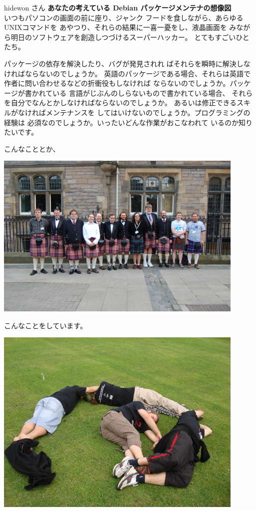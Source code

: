 \documentclass[cjk,dvipdfmx,12pt]{beamer}
\begin{document}
\begin{frame}{hidewon さん}
\textbf{あなたの考えている Debian パッケージメンテナの想像図}\\
いつもパソコンの画面の前に座り、ジャンク
フードを食しながら、あらゆるUNIXコマンドを
あやつり、それらの結果に一喜一憂をし、液晶画面を
みながら明日のソフトウェアを創造しつづけるスーパーハッカー。
とてもすごいひとたち。

パッケージの依存を解決したり、バグが発見されれ
ばそれらを瞬時に解決しなければならないのでしょうか。
英語のパッケージである場合、それらは英語で
作者に問い合わせるなどの折衝役もしなければ
ならないのでしょうか。パッケージが書かれている
言語がじぶんのしらないもので書かれている場合、
それらを自分でなんとかしなければならないのでしょうか。
あるいは修正できるスキルがなければメンテナンスを
してはいけないのでしょうか。プログラミングの経験は
必須なのでしょうか。いったいどんな作業がおこなわれて
いるのか知りたいです。
\end{frame}

\begin{frame}
こんなこととか、
\begin{center}
\includegraphics[width=12cm]{image200809/debconf7-member.jpg}
\end{center}
\end{frame}

\begin{frame}
こんなことをしています。
\begin{center}
\includegraphics[width=12cm]{image200809/guru.jpg}
\end{center}
\end{frame}
\end{document}
